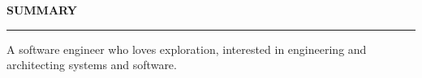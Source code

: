 \noindent\textcolor{themecolor}{\textbf{SUMMARY}}

\vspace{2mm}
\hrule
\vspace{3mm}
\noindent A software engineer who loves exploration, interested in engineering and architecting systems and software.

